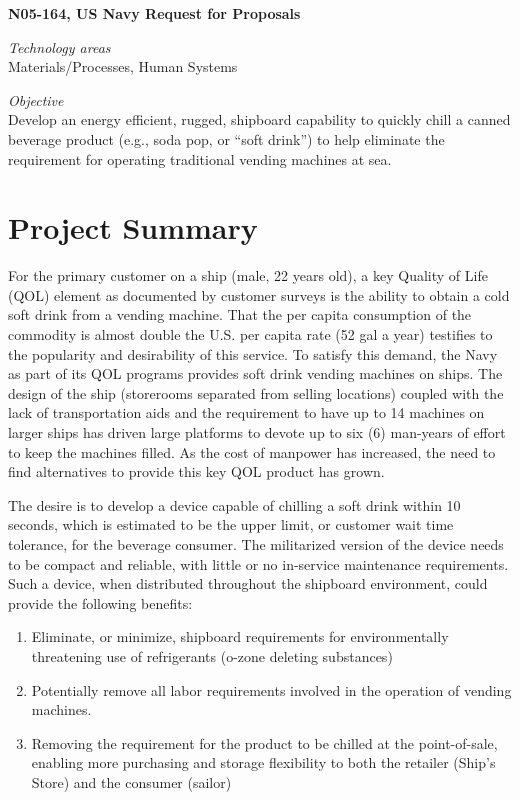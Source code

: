 \documentclass[
]{book}
\providecommand{\tightlist}{%
  \setlength{\itemsep}{0pt}\setlength{\parskip}{0pt}}
\begin{document}
\textbf{N05-164, US Navy Request for Proposals}

\emph{Technology areas}\\
Materials/Processes, Human Systems

\emph{Objective}\\
Develop an energy efficient, rugged, shipboard capability to quickly chill a canned beverage product (e.g., soda pop, or ``soft drink'') to help eliminate the requirement for operating traditional vending machines at sea.

\hypertarget{project-summary}{%
\section{Project Summary}\label{project-summary}}

For the primary customer on a ship (male, 22 years old), a key Quality of Life (QOL) element as documented by customer surveys is the ability to obtain a cold soft drink from a vending machine. That the per capita consumption of the commodity is almost double the U.S. per capita rate (52 gal a year) testifies to the popularity and desirability of this service. To satisfy this demand, the Navy as part of its QOL programs provides soft drink vending machines on ships. The design of the ship (storerooms separated from selling locations) coupled with the lack of transportation aids and the requirement to have up to 14 machines on larger ships has driven large platforms to devote up to six (6) man-years of effort to keep the machines filled. As the cost of manpower has increased, the need to find alternatives to provide this key QOL product has grown.

The desire is to develop a device capable of chilling a soft drink within 10 seconds, which is estimated to be the upper limit, or customer wait time tolerance, for the beverage consumer. The militarized version of the device needs to be compact and reliable, with little or no in-service maintenance requirements. Such a device, when distributed throughout the shipboard environment, could provide the following benefits:

\begin{enumerate}
\def\labelenumi{\arabic{enumi}.}
\tightlist
\item
  Eliminate, or minimize, shipboard requirements for environmentally threatening use of refrigerants (o-zone deleting substances)\\
\item
  Potentially remove all labor requirements involved in the operation of vending machines.\\
\item
  Removing the requirement for the product to be chilled at the point-of-sale, enabling more purchasing and storage flexibility to both the retailer (Ship's Store) and the consumer (sailor)
\end{enumerate}
\end{document}
